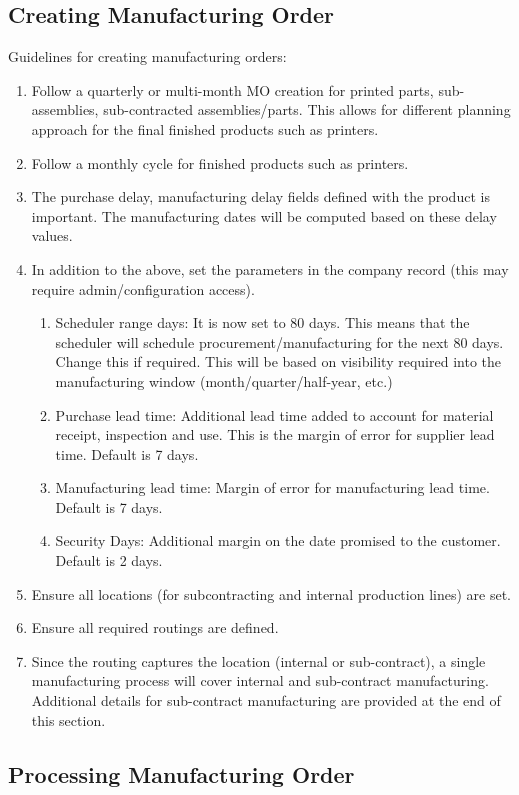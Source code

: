 \subsection{Creating Manufacturing Order}

Guidelines for creating manufacturing orders:
\begin{enumerate}
\item Follow a quarterly or multi-month MO creation for printed parts, sub-assemblies, sub-contracted assemblies/parts. This allows for different planning approach for the final finished products such as printers.
\item Follow a monthly cycle for finished products such as printers.
\item The purchase delay, manufacturing delay fields defined with the product is important. The manufacturing dates will be computed based on these delay values.
\item In addition to the above, set the parameters in the company record (this may require admin/configuration access).
\begin{enumerate}
  \item Scheduler range days: It is now set to 80 days. This means that the scheduler will schedule procurement/manufacturing for the next 80 days. Change this if required. This will be based on visibility required into the manufacturing window (month/quarter/half-year, etc.)
  \item Purchase lead time: Additional lead time added to account for material receipt, inspection and use. This is the margin of error for supplier lead time. Default is 7 days.
  \item Manufacturing lead time: Margin of error for manufacturing lead time. Default is 7 days.
  \item Security Days: Additional margin on the date promised to the customer. Default is 2 days.
\end{enumerate}
\item Ensure all locations (for subcontracting and internal production lines) are set.
\item Ensure all required routings are defined.
\item Since the routing captures the location (internal or sub-contract), a single manufacturing process will cover internal and sub-contract manufacturing. Additional details for sub-contract manufacturing are provided at the end of this section.
\end{enumerate}

\subsection{Processing Manufacturing Order}


